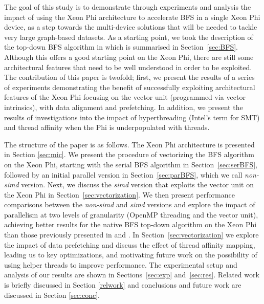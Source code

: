 \documentclass{sig-alternate-05-2015}
\begin{document}
The goal of this study is to demonstrate through experiments and
analysis the impact of using the Xeon Phi architecture to accelerate
BFS in a single Xeon Phi device, as a step towards the multi-device
solutions that will be needed to tackle very large graph-based
datasets. As a starting point, we took the description of the top-down
BFS algorithm in \cite{Gao2013} which is summarised in
Section~\ref{sec:BFS}. Although this offers a good starting point on
the Xeon Phi, there are still some architectural features that need to
be well understood in order to be exploited. The
contribution of this paper is twofold; first, we present
the results of a series of experiments demonstrating the benefit of
successfully exploiting architectural features of
the Xeon Phi focusing on the vector unit (programmed via vector
intrinsics), with data
alignment and prefetching. In addition, we present the results of
investigations into the impact of
hyperthreading (Intel's term for SMT) and thread affinity when the Phi
is underpopulated with threads.

The structure of the paper is as follows. The Xeon Phi architecture is
presented in Section \ref{sec:mic}. We present the procedure of
vectorizing the BFS algorithm on the Xeon Phi, starting with the
serial BFS algorithm in Section~\ref{sec:serBFS}, followed by an
initial parallel version in Section~\ref{sec:parBFS}, which we call
\textit{non-simd} version. Next, we discuss the \textit{simd} version
that exploits the vector unit on the Xeon Phi in
Section~\ref{sec:vectorization}. We then present performance
comparisons between the \textit{non-simd} and \textit{simd} versions
and explore the impact of parallelism at two levels of granularity
(OpenMP threading and the vector unit), achieving better results for
the native BFS top-down algorithm on the Xeon Phi than those
previously presented in \cite{MICgraphs} and \cite{stanic2014}. In
Section~\ref{sec:vectorization} we explore the impact of data
prefetching and discuss the effect of thread affinity mapping, leading
us to key optimizations, and motivating future work on the possibility
of using helper threads to improve performance. The experimental setup
and analysis of our results are shown in Sections~\ref{sec:exp}
and~\ref{sec:res}. Related work is briefly discussed in Section
\ref{relwork} and conclusions and future work are discussed in Section
\ref{sec:conc}.
 
\end{document}
